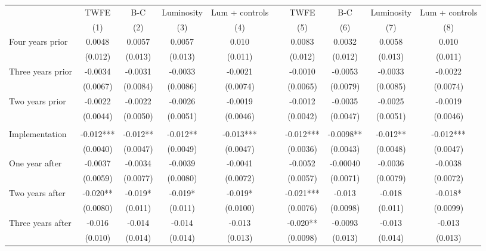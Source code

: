 \begin{tabular}{lccccccccc}
\toprule
      & TWFE  & B-C   & Luminosity & Lum + controls &       & TWFE  & B-C   & Luminosity & Lum + controls \\
\cmidrule{2-5}\cmidrule{7-10}      & (1)   & (2)   & (3)   & (4)   &       & (5)   & (6)   & (7)   & (8) \\
\midrule
\midrule
Four years prior & 0.0048 & 0.0057 & 0.0057 & 0.010 &       & 0.0083 & 0.0032 & 0.0058 & 0.010 \\
      & (0.012) & (0.013) & (0.013) & (0.011) &       & (0.012) & (0.012) & (0.013) & (0.011) \\
Three years prior & -0.0034 & -0.0031 & -0.0033 & -0.0021 &       & -0.0010 & -0.0053 & -0.0033 & -0.0022 \\
      & (0.0067) & (0.0084) & (0.0086) & (0.0074) &       & (0.0065) & (0.0079) & (0.0085) & (0.0074) \\
Two years prior & -0.0022 & -0.0022 & -0.0026 & -0.0019 &       & -0.0012 & -0.0035 & -0.0025 & -0.0019 \\
      & (0.0044) & (0.0050) & (0.0051) & (0.0046) &       & (0.0042) & (0.0047) & (0.0051) & (0.0046) \\
      &       &       &       &       &       &       &       &       &  \\
Implementation & -0.012*** & -0.012** & -0.012** & -0.013*** &       & -0.012*** & -0.0098** & -0.012** & -0.012*** \\
      & (0.0040) & (0.0047) & (0.0049) & (0.0047) &       & (0.0036) & (0.0043) & (0.0048) & (0.0047) \\
One year after & -0.0037 & -0.0034 & -0.0039 & -0.0041 &       & -0.0052 & -0.00040 & -0.0036 & -0.0038 \\
      & (0.0059) & (0.0077) & (0.0080) & (0.0072) &       & (0.0057) & (0.0071) & (0.0079) & (0.0072) \\
Two years after & -0.020** & -0.019* & -0.019* & -0.019* &       & -0.021*** & -0.013 & -0.018 & -0.018* \\
      & (0.0080) & (0.011) & (0.011) & (0.0100) &       & (0.0076) & (0.0098) & (0.011) & (0.0099) \\
Three years after & -0.016 & -0.014 & -0.014 & -0.013 &       & -0.020** & -0.0093 & -0.013 & -0.013 \\
      & (0.010) & (0.014) & (0.014) & (0.013) &       & (0.0098) & (0.013) & (0.014) & (0.013) \\

\end{tabular}
